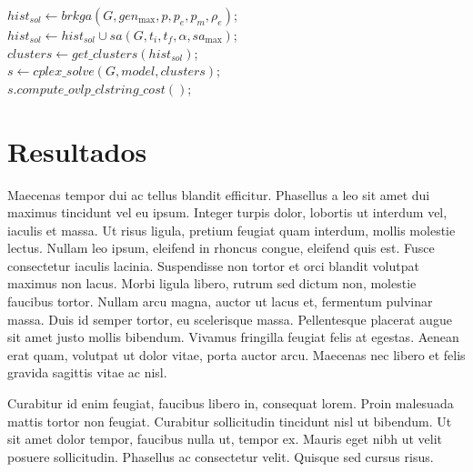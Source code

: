 \documentclass[superscriptaddress,a0]{sciposter}
\begin{document}
\begin{multicols}{3}
\begin{algorithm}[H]
    \label{alg:matheuristic}
    \Begin
    {
    $hist_{sol} \gets brkga(G, gen_{\max}, p, p_e, p_m, \rho_e)$;\\
        \label{alg:math:row:brkga}
    $hist_{sol} \gets hist_{sol} \cup sa(G, t_i, t_f, \alpha, sa_{\max})$;\\
        \label{alg:math:row:sa}
    $clusters \gets get\_clusters(hist_{sol})$\label{alg:math:row:getc};\\
    $s \gets cplex\_solve(G, model, clusters)$\label{alg:math:row:cplex};\\
    $s.compute\_ovlp\_clstring\_cost()$\label{alg:math:row:cost};\\
    \; 
    }
\end{algorithm}

\section{Resultados}

Maecenas tempor dui ac tellus blandit efficitur. Phasellus a leo sit amet dui maximus tincidunt vel eu ipsum. Integer turpis dolor, lobortis ut interdum vel, iaculis et massa. Ut risus ligula, pretium feugiat quam interdum, mollis molestie lectus. Nullam leo ipsum, eleifend in rhoncus congue, eleifend quis est. Fusce consectetur iaculis lacinia. Suspendisse non tortor et orci blandit volutpat maximus non lacus. Morbi ligula libero, rutrum sed dictum non, molestie faucibus tortor. Nullam arcu magna, auctor ut lacus et, fermentum pulvinar massa. Duis id semper tortor, eu scelerisque massa. Pellentesque placerat augue sit amet justo mollis bibendum. Vivamus fringilla feugiat felis at egestas. Aenean erat quam, volutpat ut dolor vitae, porta auctor arcu. Maecenas nec libero et felis gravida sagittis vitae ac nisl.

Curabitur id enim feugiat, faucibus libero in, consequat lorem. Proin malesuada mattis tortor non feugiat. Curabitur sollicitudin tincidunt nisl ut bibendum. Ut sit amet dolor tempor, faucibus nulla ut, tempor ex. Mauris eget nibh ut velit posuere sollicitudin. Phasellus ac consectetur velit. Quisque sed cursus risus.


\end{multicols}
\end{document}
